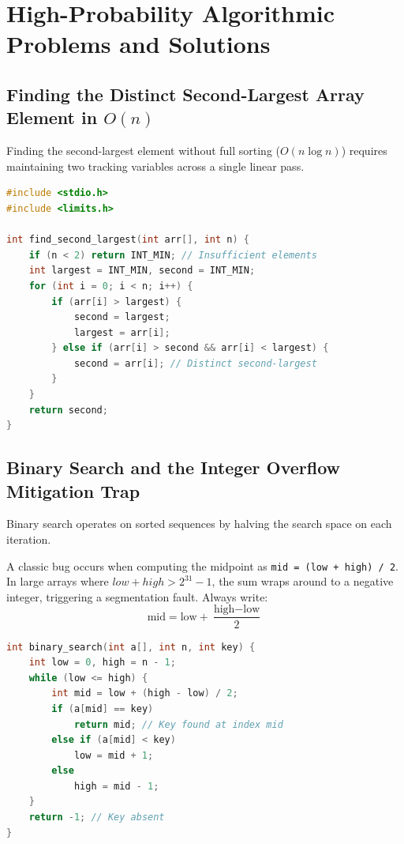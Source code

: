 \section{High-Probability Algorithmic Problems and Solutions}
\label{sec:algorithmic_problems_solutions}

\subsection{Finding the Distinct Second-Largest Array Element in $O(n)$}
Finding the second-largest element without full sorting ($O(n \log n)$) requires maintaining two tracking variables across a single linear pass.

\begin{lstlisting}[language=C]
#include <stdio.h>
#include <limits.h>

int find_second_largest(int arr[], int n) {
    if (n < 2) return INT_MIN; // Insufficient elements
    int largest = INT_MIN, second = INT_MIN;
    for (int i = 0; i < n; i++) {
        if (arr[i] > largest) {
            second = largest;
            largest = arr[i];
        } else if (arr[i] > second && arr[i] < largest) {
            second = arr[i]; // Distinct second-largest
        }
    }
    return second;
}
\end{lstlisting}

\subsection{Binary Search and the Integer Overflow Mitigation Trap}
Binary search operates on sorted sequences by halving the search space on each iteration.
\begin{tcolorbox}[colback=codebg,colframe=quotetext,title=\textbf{Exam Trap: Midpoint Index Arithmetic Overflow}]
A classic bug occurs when computing the midpoint as \texttt{mid = (low + high) / 2}. In large arrays where $low + high > 2^{31}-1$, the sum wraps around to a negative integer, triggering a segmentation fault. Always write:
\[
\boxed{\text{mid} = \text{low} + \frac{\text{high} - \text{low}}{2}}
\]
\end{tcolorbox}

\begin{lstlisting}[language=C]
int binary_search(int a[], int n, int key) {
    int low = 0, high = n - 1;
    while (low <= high) {
        int mid = low + (high - low) / 2;
        if (a[mid] == key)
            return mid; // Key found at index mid
        else if (a[mid] < key)
            low = mid + 1;
        else
            high = mid - 1;
    }
    return -1; // Key absent
}
\end{lstlisting}

